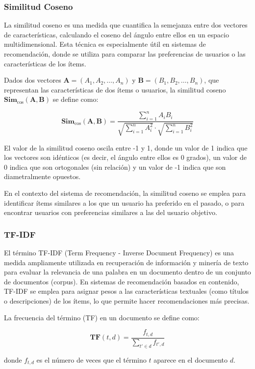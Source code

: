 \documentclass{llncs}
\begin{document}
	\subsubsection{Similitud Coseno}
	La similitud coseno es una medida que cuantifica la semejanza entre dos vectores de características, calculando el coseno del ángulo entre ellos en un espacio multidimensional. Esta técnica es especialmente útil en sistemas de recomendación, donde se utiliza para comparar las preferencias de usuarios o las características de los ítems.
	
	Dados dos vectores \( \mathbf{A} = (A_1, A_2, \ldots, A_n) \) y \( \mathbf{B} = (B_1, B_2, \ldots, B_n) \), que representan las características de dos ítems o usuarios, la similitud coseno \( \textbf{Sim}_{\cos}(\mathbf{A}, \mathbf{B}) \) se define como:
	
	\[
	\textbf{Sim}_{\cos}(\mathbf{A}, \mathbf{B}) = \frac{\sum_{i=1}^{n} A_i B_i}{\sqrt{\sum_{i=1}^{n} A_i^2} \cdot \sqrt{\sum_{i=1}^{n} B_i^2}}
	\]
	
	El valor de la similitud coseno oscila entre -1 y 1, donde un valor de 1 indica que los vectores son idénticos (es decir, el ángulo entre ellos es 0 grados), un valor de 0 indica que son ortogonales (sin relación) y un valor de -1 indica que son diametralmente opuestos.
	
	En el contexto del sistema de recomendación, la similitud coseno se emplea para identificar ítems similares a los que un usuario ha preferido en el pasado, o para encontrar usuarios con preferencias similares a las del usuario objetivo.
	
	\subsubsection{TF-IDF}
	El término TF-IDF (Term Frequency - Inverse Document Frequency) es una medida ampliamente utilizada en recuperación de información y minería de texto para evaluar la relevancia de una palabra en un documento dentro de un conjunto de documentos (corpus). En sistemas de recomendación basados en contenido, TF-IDF se emplea para asignar pesos a las características textuales (como títulos o descripciones) de los ítems, lo que permite hacer recomendaciones más precisas.
	
	La frecuencia del término (TF) en un documento se define como:
	
	\[
	\textbf{TF}(t, d) = \frac{f_{t, d}}{\sum_{t' \in d} f_{t', d}}
	\]
	
	donde \( f_{t, d} \) es el número de veces que el término \( t \) aparece en el documento \( d \).
	
\end{document}
